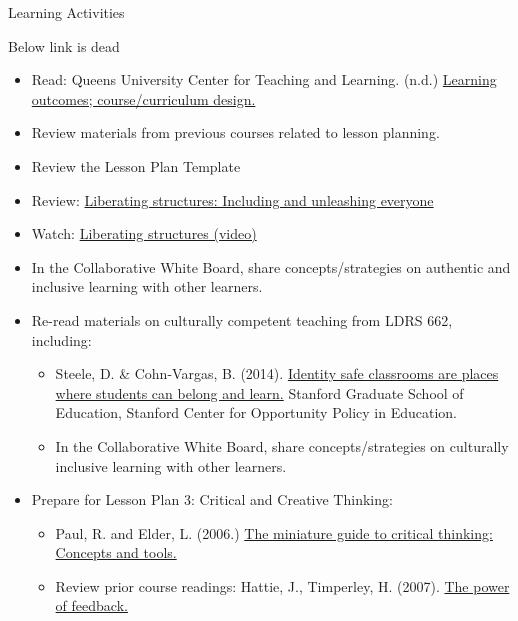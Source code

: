 \documentclass[
]{book}
\providecommand{\tightlist}{%
  \setlength{\itemsep}{0pt}\setlength{\parskip}{0pt}}
\begin{document}
\begin{reflect}
{Learning Activities }

{Below link is dead}

\begin{itemize}
\item
  Read: Queens University Center for Teaching and Learning. (n.d.) \href{http://www.queensu.ca/ctl/teaching-support/course-and-program-design}{Learning outcomes; course/curriculum design.}\\
\item
  Review materials from previous courses related to lesson planning.\\
\item
  Review the Lesson Plan Template\\
\item
  Review: \href{http://www.liberatingstructures.com/}{Liberating structures: Including and unleashing everyone}\\
\item
  Watch: \href{http://www.liberatingstructures.com/}{Liberating structures (video)}\\
\item
  In the Collaborative White Board, share concepts/strategies on authentic and inclusive learning with other learners.
\item
  Re-read materials on culturally competent teaching from LDRS 662, including:

  \begin{itemize}
  \tightlist
  \item
    Steele, D. \& Cohn-Vargas, B. (2014). \href{https://edpolicy.stanford.edu/library/video/1196}{Identity safe classrooms are places where students can belong and learn.} Stanford Graduate School of Education, Stanford Center for Opportunity Policy in Education.\\
  \item
    In the Collaborative White Board, share concepts/strategies on culturally inclusive learning with other learners.\\
  \end{itemize}
\item
  Prepare for Lesson Plan 3: Critical and Creative Thinking:

  \begin{itemize}
  \item
    Paul, R. and Elder, L. (2006.) \href{https://www.criticalthinking.org/files/Concepts_Tools.pdf}{The miniature guide to critical thinking: Concepts and tools.}
  \item
    Review prior course readings: Hattie, J., Timperley, H. (2007). \href{http://education.qld.gov.au/staff/development/performance/resources/readings/power-feedback.pdf}{The power of feedback.}
  \end{itemize}
\end{itemize}


\end{reflect}
\end{document}
